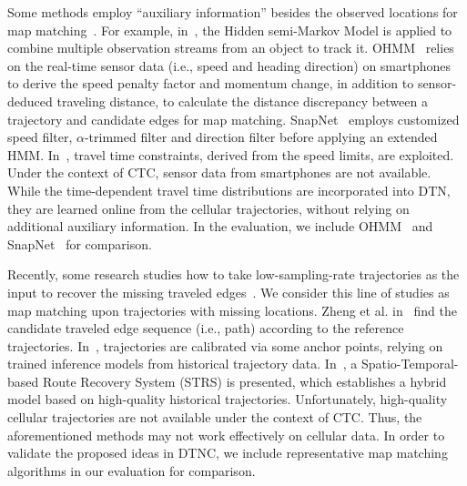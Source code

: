 \documentclass{vldb}
\begin{document}
	Some methods employ ``auxiliary information'' besides the observed locations for map matching~\cite{DBLP:journals/sigpro/YuK03,krumm2007map,goh2012online,mohamed2016accurate,hu2017if}.
	For example, in~\cite{DBLP:journals/sigpro/YuK03}, the Hidden semi-Markov Model is applied to combine multiple observation streams from an object to track it.
	OHMM~\cite{goh2012online} relies on the real-time sensor data (i.e., speed and heading direction) on smartphones to derive the speed penalty factor and momentum change, in addition to sensor-deduced traveling distance, to calculate the distance discrepancy between a trajectory and candidate edges for map matching.
	SnapNet~\cite{mohamed2016accurate} employs customized speed filter, $\alpha$-trimmed filter and direction filter before applying an extended HMM. 
	In~\cite{krumm2007map}, travel time constraints, derived from the speed limits, are exploited. 
	Under the context of CTC, sensor data from smartphones are not available. 
	While the time-dependent travel time distributions are incorporated into DTN, they are learned online from the cellular trajectories, without relying on additional auxiliary information.  
	In the evaluation, we include OHMM~\cite{goh2012online} and SnapNet~\cite{mohamed2016accurate} for comparison.
	
	Recently, some research studies how to take low-sampling-rate trajectories as the input to recover the missing traveled edges~\cite{zheng2012reducing,su2015calibrating,DBLP:conf/kdd/WuMSZZCW16}.
	We consider this line of studies as map matching upon trajectories with missing locations.
	Zheng et al. in~\cite{zheng2012reducing} find the candidate traveled edge sequence (i.e., path) according to the reference trajectories.
	In~\cite{su2015calibrating}, trajectories are calibrated via some anchor points, relying on trained inference models from historical trajectory data. 
	In~\cite{DBLP:conf/kdd/WuMSZZCW16}, a Spatio-Temporal-based Route Recovery System (STRS) is presented, which establishes a hybrid model based on high-quality historical trajectories.
	Unfortunately, high-quality cellular trajectories are not available under the context of CTC. Thus, the aforementioned methods may not work effectively on cellular data. 
	In order to validate the proposed ideas in DTNC, we include representative map matching algorithms in our evaluation for comparison. 
\end{document}
